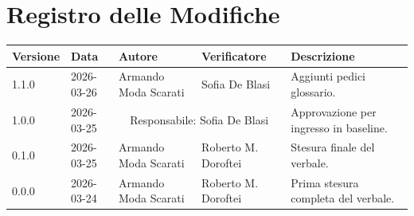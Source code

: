 \section*{Registro delle Modifiche}
\begin{table}[ht]
	\centering
	\renewcommand{\arraystretch}{1.5}
	\begin{longtable}{>{\ttfamily\small}l l l l >{\raggedright\arraybackslash}p{5cm}}
		\toprule
		\textbf{Versione} & \textbf{Data} & \textbf{Autore} & \textbf{Verificatore} & \textbf{Descrizione} \\
		\midrule
		1.1.0 & 2026-03-26 & Armando Moda Scarati & Sofia De Blasi & Aggiunti pedici glossario. \\
		1.0.0 & 2026-03-25 & \multicolumn{2}{c}{Responsabile: Sofia De Blasi} & Approvazione per ingresso in baseline. \\
		0.1.0 & 2026-03-25 & Armando Moda Scarati & Roberto M. Doroftei & Stesura finale del verbale. \\
		0.0.0 & 2026-03-24 & Armando Moda Scarati & Roberto M. Doroftei & Prima stesura completa del verbale. \\
		\bottomrule
	\end{longtable}
\end{table}